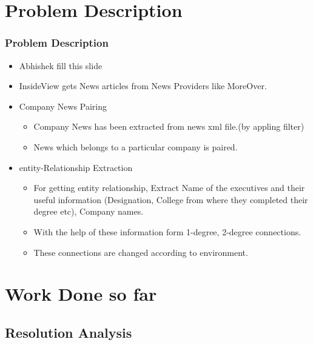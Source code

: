 \documentclass[10pt]{beamer}
\begin{document}
\section{Problem Description}
\begin{frame}
\frametitle{Problem Description}
\begin{itemize}
\item Abhishek fill this slide
\item InsideView gets News articles from News Providers like MoreOver.
\item Company News Pairing
\begin{itemize}
\item Company News has been extracted from news xml file.(by appling filter)
\item News which belongs to a particular company is paired.
\end{itemize}
\item entity-Relationship Extraction
\begin{itemize}
\item For getting entity relationship, Extract Name of the executives and their useful information (Designation, College from where they completed their degree etc), Company names.
\item With the help of these information form 1-degree, 2-degree connections.
\item These connections are changed according to environment.
\end{itemize}
\end{itemize}
\end{frame}
\section{Work Done so far}
\subsection{Resolution Analysis}
\end{document}

